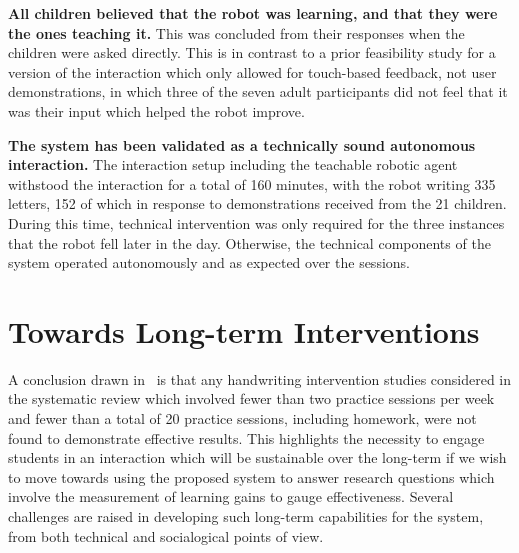 \documentclass{sig-alternate}
\begin{document}
    \textbf{All children believed that the robot was learning, and that
        they were the ones teaching it.} This was concluded from their responses
        when the children were asked directly. This is in contrast to a prior
        feasibility study for a version of the interaction which only allowed
        for touch-based feedback, not user demonstrations, in which three of the
        seven adult participants did not feel that it was their input which
        helped the robot improve.



    \textbf{The system has been validated as a technically sound
        autonomous interaction.} The interaction setup including the teachable
        robotic agent withstood the interaction for a total of 160 minutes, with
        the robot writing 335 letters, 152 of which in response to
        demonstrations received from the 21 children. During this time, technical 
	intervention was only required for the three instances that the robot fell 
	later in the day. Otherwise, the technical components of the system operated 
	autonomously and as expected over the sessions.




\section{Towards Long-term Interventions}\label{sec:futureWork}

A conclusion drawn in~\cite{Hoy2011} is that any 
handwriting intervention studies considered in the systematic review which involved 
fewer than two practice sessions per week and fewer than a total of 20 practice 
sessions, including homework, were not found to demonstrate effective results. This 
highlights the necessity to engage students in an interaction which will be sustainable
 over the long-term if we wish to move towards using the proposed system to answer 
research questions which involve the measurement of learning gains to gauge effectiveness. 
Several challenges are raised in developing such long-term capabilities for the system,
 from both technical and socialogical points of view. %
\end{document}
